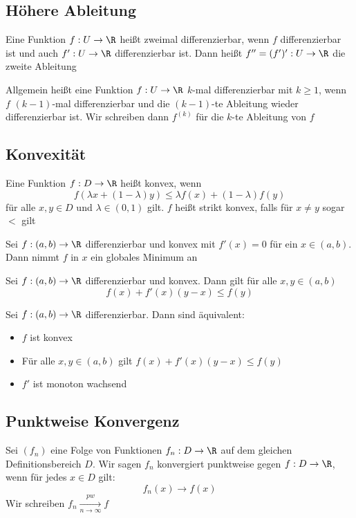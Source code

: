 	\subsection{Höhere Ableitung}
		\begin{Definition} 
			Eine Funktion $f:U\to\R$ heißt zweimal differenzierbar, wenn $f$ differenzierbar ist und auch $f':U\to\R$ differenzierbar ist. Dann heißt $f''=(f')':U\to\R$ die zweite Ableitung
		\end{Definition}	
		\begin{Definition} [ $k$-te Ableitung]
			Allgemein heißt eine Funktion $f: U\to\R$ $k$-mal differenzierbar mit $k\geq 1$, wenn $f$ $(k-1)$-mal differenzierbar und die $(k-1)$-te Ableitung wieder differenzierbar ist. Wir schreiben dann $f^(k)$ für die $k$-te Ableitung von $f$
		\end{Definition}
	\subsection{Konvexität}
		\begin{Definition} [ Konvex]
			Eine Funktion $f:D\to\R$ heißt konvex, wenn
			$$
				f(\lambda x+(1-\lambda)y)\leq\lambda f(x)+(1-\lambda)f(y)
			$$
			für alle $x, y\in D$ und $\lambda\in(0,1)$ gilt. $f$ heißt strikt konvex, falls für $x\not =y$ sogar $<$ gilt
		\end{Definition}
		\begin{Satz} [ ]
			Sei $f:(a, b)\to\R$ differenzierbar und konvex mit $f'(x)=0$ für ein $x\in (a, b)$. Dann nimmt $f$ in $x$ ein globales Minimum an
		\end{Satz}
		\begin{Lemma} [ ]
			Sei $f:(a, b)\to\R$ differenzierbar und konvex. Dann gilt für alle $x, y\in(a, b)$
			$$
				f(x)+f'(x)(y-x)\leq f(y)
			$$
		\end{Lemma}
		\begin{Satz} [ ]
			Sei $f: (a, b)\to\R$ differenzierbar. Dann sind äquivalent:
			\begin{itemize}
				\item $f$ ist konvex
				\item Für alle $x, y \in (a, b)$ gilt $f(x)+f'(x)(y-x)\leq f(y)$
				\item $f'$ ist monoton wachsend
			\end{itemize}
		\end{Satz}
	\subsection{Punktweise Konvergenz}
		\begin{Definition} 
			Sei $(f_n)$ eine Folge von Funktionen $f_n:D\to\R$ auf dem gleichen Definitionsbereich $D$. Wir sagen $f_n$ konvergiert punktweise gegen $f: D\to\R$, wenn für jedes $x\in D$ gilt:
			$$
				f_n(x)\to f(x)
			$$
			Wir schreiben $f_n\xrightarrow[n\to\infty]{pw}f$
		\end{Definition}
